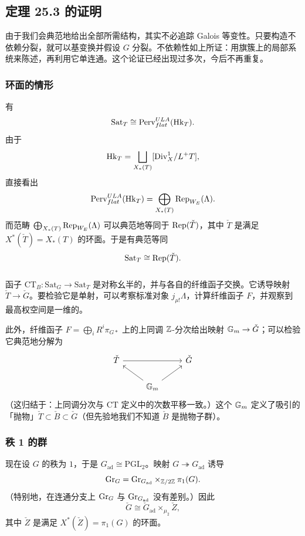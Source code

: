 \subsection{定理 25.3 的证明}

由于我们会典范地给出全部所需结构，其实不必追踪 Galois 等变性。只要构造不依赖分裂，就可以基变换并假设 $G$ 分裂。不依赖性如上所证：用旗簇上的局部系统来陈述，再利用它单连通。这个论证已经出现过多次，今后不再重复。

\subsubsection{环面的情形}

有
\[
\mathrm{Sat}_T\cong\operatorname{Perv}^{ULA}_{flat}(\mathrm{Hk}_T).
\]
由于
\[
\mathrm{Hk}_T=\bigsqcup_{X_*(T)}[\mathrm{Div}^1_X/L^+T],
\]
直接看出
\[
\operatorname{Perv}^{ULA}_{flat}(\mathrm{Hk}_T)=\bigoplus_{X_*(T)}\operatorname{Rep}_{W_E}(\Lambda).
\]
而范畴 $\bigoplus_{X_*(T)}\operatorname{Rep}_{W_E}(\Lambda)$ 可以典范地等同于 $\operatorname{Rep}(\check T)$，其中 $\check T$ 是满足 $X^*(\check T)=X_*(T)$ 的环面。于是有典范等同
\[
\mathrm{Sat}_T\cong\operatorname{Rep}(\check T).
\]

\subsubsection{}

函子 $\mathrm{CT}_B\colon\mathrm{Sat}_G\to\mathrm{Sat}_T$ 是对称幺半的，并与各自的纤维函子交换。它诱导映射 $\check T\to\check G$。要检验它是单射，可以考察标准对象 $j_{\mu!}\Lambda$，计算纤维函子 $F$，并观察到最高权空间是一维的。

此外，纤维函子 $F=\bigoplus_i R^i\pi_{G*}$ 上的上同调 $\mathbb{Z}$-分次给出映射 $\mathbb{G}_m\to\check G$；可以检验它典范地分解为
\[
\begin{tikzcd}
\check T \arrow[rr] & & \check G \\
& \GG_m \arrow[ul] \arrow[ur] &
\end{tikzcd}
\]
（这归结于：上同调分次与 $\mathrm{CT}$ 定义中的次数平移一致。）这个 $\mathbb{G}_m$ 定义了吸引的「抛物」$\check T\subset\check B\subset\check G$（但先验地我们不知道 $\check B$ 是抛物子群）。

\subsubsection{秩 1 的群}

现在设 $G$ 的秩为 $1$，于是 $G_{\mathrm{ad}}\cong\mathrm{PGL}_2$。映射 $G\twoheadrightarrow G_{\mathrm{ad}}$ 诱导
\[
\mathrm{Gr}_G=\mathrm{Gr}_{G_{\mathrm{ad}}}\times_{\mathbb{Z}/2\mathbb{Z}}\pi_1(G).
\]
（特别地，在连通分支上 $\mathrm{Gr}_G$ 与 $\mathrm{Gr}_{G_{\mathrm{ad}}}$ 没有差别。）因此
\[
\check G\cong\check G_{\mathrm{ad}}\times_{\mu_2}\check Z,
\]
其中 $\check Z$ 是满足 $X^*(\check Z)=\pi_1(G)$ 的环面。

